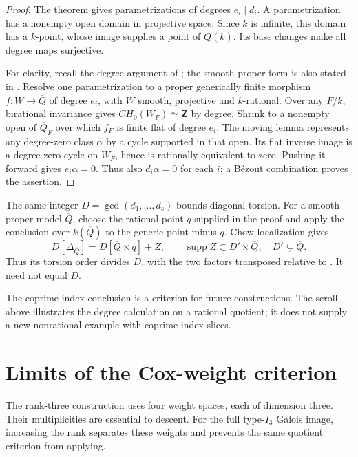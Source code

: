 \documentclass[11pt]{article}
\theoremstyle{remark}
\newcommand{\Z}{\mathbf Z}
\begin{document}
\begin{proof}
The theorem gives parametrizations of degrees \(e_i\mid d_i\).
A parametrization has a nonempty open domain in projective space.  Since
\(k\) is infinite, this domain has a \(k\)-point, whose image supplies
a point of \(\overline Q(k)\).  Its base changes make all degree maps
surjective.

For clarity, recall the degree argument of
\cite[Lemma~6.2 and Propositions~6.3--6.4]{CTCoray}; the smooth proper
form is also stated in \cite[Section~1.2]{ACTP}.
Resolve one parametrization to a proper generically finite morphism
\(f:W\to\overline Q\) of degree \(e_i\), with \(W\) smooth,
projective and \(k\)-rational.  Over any \(F/k\), birational invariance
gives \(CH_0(W_F)\simeq\Z\) by degree.  Shrink to a nonempty open
of \(\overline Q_F\) over which \(f_F\) is finite flat of degree
\(e_i\).  The moving lemma represents any degree-zero class \(\alpha\)
by a cycle supported in that open.  Its flat inverse image is a degree-zero
cycle on \(W_F\), hence is rationally equivalent to zero.  Pushing it
forward gives \(e_i\alpha=0\).  Thus also \(d_i\alpha=0\) for each
\(i\); a B\'ezout combination proves the assertion.
\end{proof}

The same integer \(D=\gcd(d_1,\ldots,d_s)\) bounds diagonal torsion.
For a smooth proper model \(\overline Q\), choose the rational point \(q\)
supplied in the proof and apply the conclusion over \(k(\overline Q)\) to
the generic point minus \(q\).  Chow localization gives
\[
 D[\Delta_{\overline Q}]=D[\overline Q\times q]+Z,\qquad
 \operatorname{supp}Z\subset D'\times\overline Q,\quad
 D'\subsetneq\overline Q.
\]
Thus its torsion order divides \(D\), with the two factors transposed
relative to \cite[Definition~1.1 and Lemma~1.3]{ChatzistamatiouLevine}.
It need not equal \(D\).

The coprime-index conclusion is a criterion for future constructions.
The scroll above illustrates the degree calculation on a rational quotient;
it does not supply a new nonrational example with coprime-index slices.

\section{Limits of the Cox-weight criterion}\label{sec:limits}

The rank-three construction uses four weight spaces, each of dimension
three.  Their multiplicities are essential to descent.  For the full
type-\(I_3\) Galois image, increasing the rank separates these weights and
prevents the same quotient criterion from applying.
\end{document}
